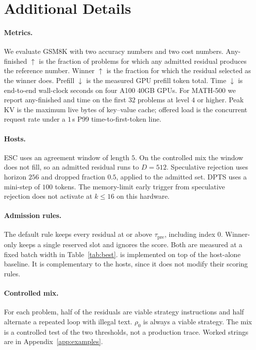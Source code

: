 \appendix

\section{Additional Details}
\label{app:details}

\paragraph{Metrics.}
We evaluate GSM8K with two accuracy numbers and two cost numbers.
Any-finished $\uparrow$ is the fraction of problems for which any admitted residual produces the reference number.
Winner $\uparrow$ is the fraction for which the residual selected as the winner does.
Prefill $\downarrow$ is the measured GPU prefill token total.
Time $\downarrow$ is end-to-end wall-clock seconds on four A100 40GB GPUs.
For MATH-500 we report any-finished and time on the first $32$ problems at level $4$ or higher.
Peak KV is the maximum live bytes of key--value cache; offered load is the concurrent request rate under a $1$\,s P99 time-to-first-token line.

\paragraph{Hosts.}
ESC uses an agreement window of length $5$.
On the controlled mix the window does not fill, so an admitted residual runs to $D{=}512$.
Speculative rejection uses horizon $256$ and dropped fraction $0.5$, applied to the admitted set.
DPTS uses a mini-step of $100$ tokens.
The memory-limit early trigger from speculative rejection does not activate at $k \le 16$ on this hardware.

\paragraph{Admission rules.}
The default rule keeps every residual at or above $\tau_{\mathrm{pre}}$, including index $0$.
Winner-only keeps a single reserved slot and ignores the score.
Both are measured at a fixed batch width in Table~\ref{tab:best}.
\sys is implemented on top of the host-alone baseline.
It is complementary to the hosts, since it does not modify their scoring rules.

\paragraph{Controlled mix.}
For each problem, half of the residuals are viable strategy instructions and half alternate a repeated loop with illegal text.
$\rho_0$ is always a viable strategy.
The mix is a controlled test of the two thresholds, not a production trace.
Worked strings are in Appendix~\ref{app:examples}.

